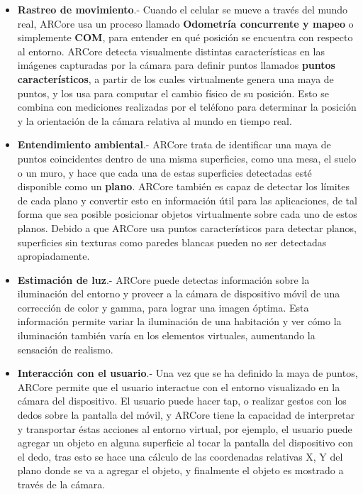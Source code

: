 \begin{itemize}
	\item \textbf{Rastreo de movimiento}.- Cuando el celular se mueve a través del mundo real, ARCore usa un proceso llamado \textbf{Odometría concurrente y mapeo} o simplemente \textbf{COM}, para entender en qué posición se encuentra con respecto al entorno. ARCore detecta visualmente distintas características en las imágenes capturadas por la cámara para definir puntos llamados \textbf{puntos característicos}, a partir de los cuales virtualmente genera una maya de puntos, y los usa para computar el cambio físico de su posición. Esto se combina con mediciones realizadas por el teléfono para determinar la posición y la orientación de la cámara relativa al mundo en tiempo real.
	
	\item \textbf{Entendimiento ambiental}.- ARCore trata de identificar una maya de puntos coincidentes dentro de una misma superficies, como una mesa, el suelo o un muro, y hace que cada una de estas superficies detectadas esté disponible como un \textbf{plano}. ARCore también es capaz de detectar los límites de cada plano y convertir esto en información útil para las aplicaciones, de tal forma que sea posible posicionar objetos virtualmente sobre cada uno de estos planos. Debido a que ARCore usa puntos característicos para detectar planos, superficies sin texturas como paredes blancas pueden no ser detectadas apropiadamente.
	
	\item \textbf{Estimación de luz}.- ARCore puede detectas información sobre la iluminación del entorno y proveer a la cámara de dispositivo móvil de una corrección de color y gamma, para lograr una imagen óptima. Esta información permite variar la iluminación de una habitación y ver cómo la iluminación también varía en los elementos virtuales, aumentando la sensación de realismo.
	
	\item \textbf{Interacción con el usuario}.- Una vez que se ha definido la maya de puntos, ARCore permite que el usuario interactue con el entorno visualizado en la cámara del dispositivo. El usuario puede hacer tap, o realizar gestos con los dedos sobre la pantalla del móvil, y ARCore tiene la capacidad de interpretar y transportar éstas acciones al entorno virtual, por ejemplo, el usuario puede agregar un objeto en alguna superficie al tocar la pantalla del dispositivo con el dedo, tras esto se hace una cálculo de las coordenadas relativas X, Y del plano donde se va a agregar el objeto, y finalmente el objeto es mostrado a través de la cámara.
	

\end{itemize}
